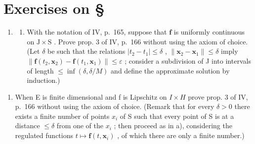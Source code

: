 \section*{Exercises on \S{}}
{}

\begin{enumerate}
\def\labelenumi{\arabic{enumi})}
\tightlist
\item
  \begin{enumerate}
  \def\labelenumii{\alph{enumii})}
  \tightlist
  \item
    With the notation of IV, p.~165, suppose that \(\mathbf{f}\) is uniformly continuous on \(\mathrm{J} \times \mathrm{S}\) . Prove prop. 3 of IV, p.~166 without using the axiom of choice. (Let \(\delta\) be such that the relations \(|t_2 - t_1| \leqslant \delta\) , \(\| \mathbf{x}_2 - \mathbf{x}_1 \| \leqslant \delta\) imply \(\| \mathbf{f}(t_2, \mathbf{x}_2) - \mathbf{f}(t_1, \mathbf{x}_1) \| \leqslant \varepsilon\) ; consider a subdivision of J into intervals of length \(\leqslant \inf(\delta, \delta / M)\) and define the approximate solution by induction.)
  \end{enumerate}
\end{enumerate}

\begin{enumerate}
\def\labelenumi{\alph{enumi})}
\setcounter{enumi}{1}
\tightlist
\item
  When E is finite dimensional and f is Lipschitz on \(I \times H\) prove prop. 3 of IV, p.~166 without using the axiom of choice. (Remark that for every \(\delta > 0\) there exists a finite number of points \(x_{i}\) of S such that every point of S is at a distance \(\leqslant \delta\) from one of the \(x_{i}\) ; then proceed as in a), considering the regulated functions \(t \mapsto \mathbf{f}(t, \mathbf{x}_{i})\) , of which there are only a finite number.)
\end{enumerate}

